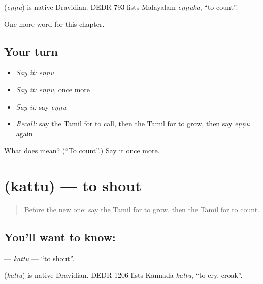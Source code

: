 \begin{cousinweb}
\textbf{} (\emph{eṇṇu}) is native Dravidian. DEDR 793 lists Malayalam \emph{eṇṇuka}, \textquotedblleft{}to count\textquotedblright{}.
\end{cousinweb}

\begin{grammarlens}[title={What you've built}]
One more word for this chapter.
\end{grammarlens}

\subsection*{Your turn}
\begin{itemize}
\raggedright
  \item \emph{Say it:} \emph{eṇṇu}
  \item \emph{Say it:} \emph{eṇṇu}, once more
  \item \emph{Say it:} say \emph{eṇṇu}
  \item \emph{Recall:} say the Tamil for to call, then the Tamil for to grow, then say \emph{eṇṇu} again
\end{itemize}

\begin{tcolorbox}[breakable,colback=teal!4,colframe=teal!35!black,title={Before you move on}]
What does  mean? (\textquotedblleft{}To count\textquotedblright{}.) Say it once more.
\end{tcolorbox}
\section[\texorpdfstring{\ta{கத்து} (kattu)}{கத்து (kattu)}]{ (kattu) — to shout}

\label{lesson:TA-C154-kattu}



\begin{quote}
Before the new one: say the Tamil for to grow, then the Tamil for to count.
\end{quote}

\subsection*{You'll want to know: }
\textbf{} — \emph{kattu} — \textquotedblleft{}to shout\textquotedblright{}.

\begin{cousinweb}
\textbf{} (\emph{kattu}) is native Dravidian. DEDR 1206 lists Kannada \emph{kattu}, \textquotedblleft{}to cry, croak\textquotedblright{}.
\end{cousinweb}

